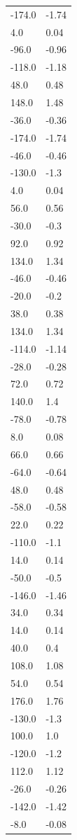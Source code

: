 \begin{longtable}{ll}
-174.0 & -1.74 \\
4.0 & 0.04 \\
-96.0 & -0.96 \\
-118.0 & -1.18 \\
48.0 & 0.48 \\
148.0 & 1.48 \\
-36.0 & -0.36 \\
-174.0 & -1.74 \\
-46.0 & -0.46 \\
-130.0 & -1.3 \\
4.0 & 0.04 \\
56.0 & 0.56 \\
-30.0 & -0.3 \\
92.0 & 0.92 \\
134.0 & 1.34 \\
-46.0 & -0.46 \\
-20.0 & -0.2 \\
38.0 & 0.38 \\
134.0 & 1.34 \\
-114.0 & -1.14 \\
-28.0 & -0.28 \\
72.0 & 0.72 \\
140.0 & 1.4 \\
-78.0 & -0.78 \\
8.0 & 0.08 \\
66.0 & 0.66 \\
-64.0 & -0.64 \\
48.0 & 0.48 \\
-58.0 & -0.58 \\
22.0 & 0.22 \\
-110.0 & -1.1 \\
14.0 & 0.14 \\
-50.0 & -0.5 \\
-146.0 & -1.46 \\
34.0 & 0.34 \\
14.0 & 0.14 \\
40.0 & 0.4 \\
108.0 & 1.08 \\
54.0 & 0.54 \\
176.0 & 1.76 \\
-130.0 & -1.3 \\
100.0 & 1.0 \\
-120.0 & -1.2 \\
112.0 & 1.12 \\
-26.0 & -0.26 \\
-142.0 & -1.42 \\
-8.0 & -0.08 \\

\end{longtable}
